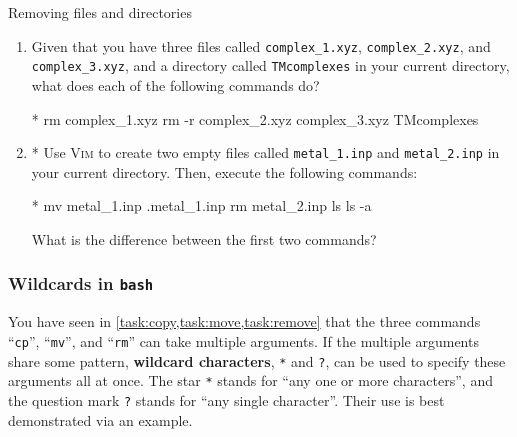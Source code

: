       \begin{task}[label=task:remove]{Removing files and directories}
        \begin{enumerate}[label=(\alph*)]
          \item Given that you have three files called \texttt{complex\_1.xyz}, \texttt{complex\_2.xyz}, and \texttt{complex\_3.xyz}, and a directory called \texttt{TMcomplexes} in your current directory, what does each of the following commands do?
          \begin{bashcmd}*{}
            rm complex_1.xyz
            rm -r complex_2.xyz complex_3.xyz TMcomplexes
          \end{bashcmd}

          \item * Use \textsc{Vim} to create two empty files called \texttt{metal\_1.inp} and \texttt{metal\_2.inp} in your current directory.
          Then, execute the following commands:
          \begin{bashcmd}*{}
            mv metal_1.inp .metal_1.inp
            rm metal_2.inp
            ls
            ls -a
          \end{bashcmd}
          What is the difference between the first two commands?
        \end{enumerate}
      \end{task}

    \subsubsection{Wildcards in \texttt{bash}}

      You have seen in \cref{task:copy,task:move,task:remove} that the three commands \enquote{\texttt{cp}}, \enquote{\texttt{mv}}, and \enquote{\texttt{rm}} can take multiple arguments.
      If the multiple arguments share some pattern, \textbf{wildcard characters}, \ie \texttt{*} and \texttt{?}, can be used to specify these arguments all at once.
      The star \texttt{*} stands for \enquote{any one or more characters}, and the question mark \texttt{?} stands for \enquote{any single character}.
      Their use is best demonstrated via an example.

